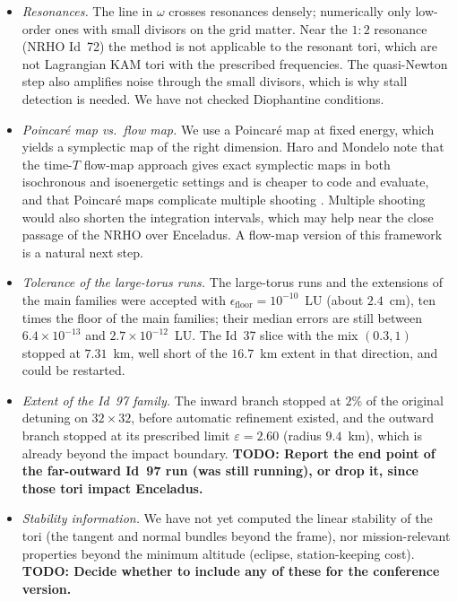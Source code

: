 \documentclass[11pt]{article}
\newcommand{\todo}[1]{\textbf{TODO: #1}}
\begin{document}
\begin{itemize}
  the QPOs of the larger tori pass below the mean surface of Enceladus, and members with
  Id~$\ge113$ have perilunes below it. Since the point-mass model does not see the surface, we keep
  these tori and mark them (\cref{tab:families,sec:limits-surface}). The scan of \cref{sec:scan} is
  therefore part of the method for this problem: perilune altitude, as well as resonance distance
  and the extent of the regular region, decides which members are worth continuing. Altitudes here
  are measured from the $252.1$~km mean radius.
\item \emph{Resonances.} The line in $\omega$ crosses resonances densely; numerically only
  low-order ones with small divisors on the grid matter. Near the $1{:}2$ resonance (NRHO Id~72)
  the method is not applicable to the resonant tori, which are not Lagrangian KAM tori with the
  prescribed frequencies. The quasi-Newton step also amplifies noise through the small divisors,
  which is why stall detection is needed. We have not checked Diophantine conditions.
\item \emph{Poincar\'e map vs.\ flow map.} We use a Poincar\'e map at fixed energy, which yields a
  symplectic map of the right dimension. Haro and Mondelo note that the time-$T$ flow-map approach
  gives exact symplectic maps in both isochronous and isoenergetic settings and is cheaper to code
  and evaluate, and that Poincar\'e maps complicate multiple shooting
  \cite[Remark~2.4.5, pp.~8--9]{haromondelo2021flow}. Multiple shooting would also shorten the
  integration intervals, which may help near the close passage of the NRHO over Enceladus. A flow-map version of this framework
  \cite{haromondelo2021flow,fernandezmora2024siads,fernandezmora2026convergence} is a natural next
  step.
\item \emph{Tolerance of the large-torus runs.} The large-torus runs and the extensions of the
  main families were accepted with $\epsilon_{\mathrm{floor}} = 10^{-10}$~LU (about $2.4$~cm), ten
  times the floor of the main families; their median errors are still between $6.4\times10^{-13}$ and $2.7\times10^{-12}$~LU.
  The Id~37 slice with the mix $(0.3,1)$ stopped at $7.31$~km, well short of the $16.7$~km extent
  in that direction, and could be restarted.
\item \emph{Extent of the Id~97 family.} The inward branch stopped at $2\%$ of the original
  detuning on $32\times32$, before automatic refinement existed, and the outward branch stopped at
  its prescribed limit $\varepsilon = 2.60$ (radius $9.4$~km), which is already beyond the impact
  boundary. \todo{Report the end point of the far-outward Id~97 run (was still running), or drop
  it, since those tori impact Enceladus.}
\item \emph{Stability information.} We have not yet computed the linear stability of the tori
  (the tangent and normal bundles beyond the frame), nor mission-relevant properties beyond the
  minimum altitude (eclipse, station-keeping cost). \todo{Decide whether to include any of
  these for the conference version.}
\end{itemize}
\end{document}
